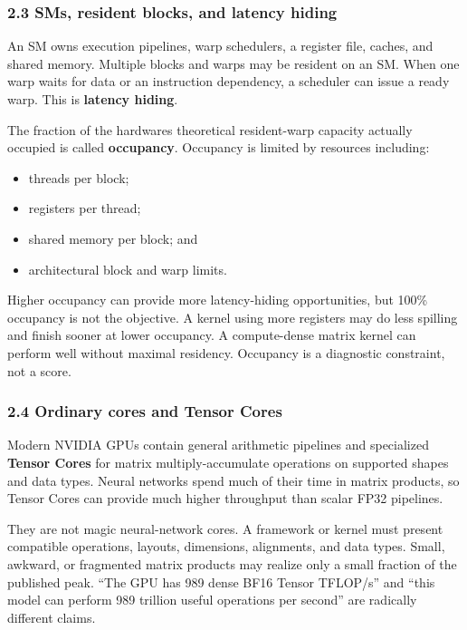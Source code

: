\documentclass[
  10pt,
  letterpaper,
]{article}
\providecommand{\tightlist}{%
  \setlength{\itemsep}{0pt}\setlength{\parskip}{0pt}}
\begin{document}
\subsubsection{2.3 SMs, resident blocks, and latency
hiding}\label{23-sms-resident-blocks-and-latency-hiding}

An SM owns execution pipelines, warp schedulers, a register file,
caches, and shared memory. Multiple blocks and warps may be resident on
an SM. When one warp waits for data or an instruction dependency, a
scheduler can issue a ready warp. This is \textbf{latency hiding}.

The fraction of the hardware\textquotesingle s theoretical resident-warp
capacity actually occupied is called \textbf{occupancy}. Occupancy is
limited by resources including:

\begin{itemize}
\tightlist
\item
  threads per block;
\item
  registers per thread;
\item
  shared memory per block; and
\item
  architectural block and warp limits.
\end{itemize}

Higher occupancy can provide more latency-hiding opportunities, but
100\% occupancy is not the objective. A kernel using more registers may
do less spilling and finish sooner at lower occupancy. A compute-dense
matrix kernel can perform well without maximal residency. Occupancy is a
diagnostic constraint, not a score.

\subsubsection{2.4 Ordinary cores and Tensor
Cores}\label{24-ordinary-cores-and-tensor-cores}

Modern NVIDIA GPUs contain general arithmetic pipelines and specialized
\textbf{Tensor Cores} for matrix multiply-accumulate operations on
supported shapes and data types. Neural networks spend much of their
time in matrix products, so Tensor Cores can provide much higher
throughput than scalar FP32 pipelines.

They are not magic neural-network cores. A framework or kernel must
present compatible operations, layouts, dimensions, alignments, and data
types. Small, awkward, or fragmented matrix products may realize only a
small fraction of the published peak. ``The GPU has 989 dense BF16
Tensor TFLOP/s'' and ``this model can perform 989 trillion useful
operations per second'' are radically different claims.
\end{document}
